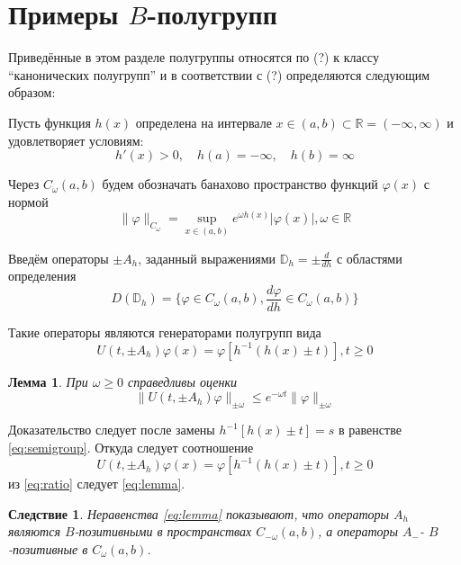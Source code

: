 \documentclass{article}
\newtheorem{lemma}{Лемма}
\newtheorem{corollary}{Следствие}[lemma]
\begin{document}
\section*{Примеры $B$-полугрупп}

Приведённые в этом разделе полугруппы относятся по (?) к классу ``канонических полугрупп'' и в соответствии
с (?) определяются следующим образом:

Пусть функция $h(x)$ определена на интервале $x \in (a, b) \subset \mathbb{R} = (-\infty, \infty)$
и удовлетворяет условиям:
\begin{equation*}
    h'(x) > 0, \quad h(a) = -\infty, \quad h(b) = \infty
\end{equation*}

Через $C_\omega (a, b)$ будем обозначать банахово пространство функций $\varphi (x)$ с нормой
\begin{equation}
    \|\varphi\|_{C_\omega} = \sup_{x \in (a, b)} e^{\omega h(x)} |\varphi(x)|, \omega \in \mathbb{R}
\end{equation}

Введём операторы $\pm A_h$, заданный выражениями $\mathbb{D}_h = \pm \frac{d}{dh}$ с областями определения
\begin{equation}
    D(\mathbb{D}_h) = \{\varphi \in C_\omega(a, b), \frac{d\varphi}{dh} \in C_\omega(a, b)\}
\end{equation}

Такие операторы являются генераторами полугрупп вида
\begin{equation}
    \label{eq:semigroup}
    U(t, \pm A_h)\varphi(x) = \varphi[h^{-1}(h(x) \pm t)], t \ge 0
\end{equation}

\begin{lemma}
    При $\omega \ge 0$ справедливы оценки
    \begin{equation}
        \label{eq:lemma}
        \|U(t, \pm A_h)\varphi\|_{\pm\omega} \le e^{-\omega t} \|\varphi\|_{\pm \omega}
    \end{equation}
\end{lemma}

Доказательство следует после замены $h^{-1}[h(x) \pm t] = s$ в равенстве \eqref{eq:semigroup}. Откуда
следует соотношение
\begin{equation}
    \label{eq:ratio}
    U(t, \pm A_h)\varphi(x) = \varphi[h^{-1}(h(x) \pm t)], t \ge 0
\end{equation}
из \eqref{eq:ratio} следует \eqref{eq:lemma}.

\begin{corollary}
        Неравенства \eqref{eq:lemma} показывают, что операторы $A_h$ являются $B$-позитивными
        в пространствах $C_{-\omega}(a, b)$, а операторы $A_{-}$- $B$-позитивные в $C_{\omega}(a, b)$.
\end{corollary}
\end{document}
